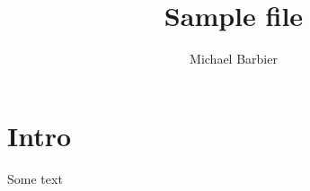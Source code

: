 \documentclass[a4paper,12pt]{article}
\author{Michael Barbier}
\title{Sample \tex file}
\begin{document}
\section{Intro}
Some text
\end{document}

